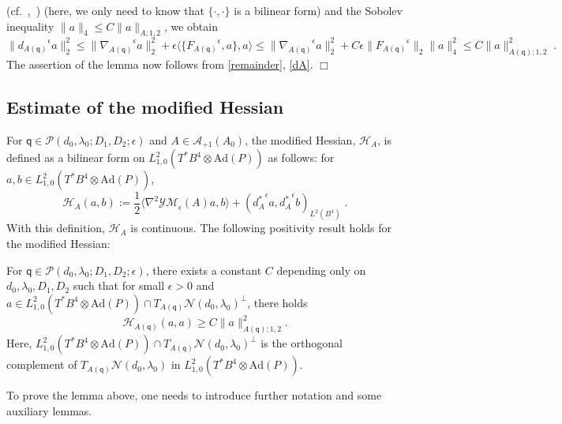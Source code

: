 \documentclass[11pt]{article}
\numberwithin{equation}{section} \setlength{\topmargin}{-35pt}
\newcommand{\PP}{\mathcal{P}}
\newcommand{\Ad}{\text{Ad}}
\newcommand{\YMe}{\mathcal{YM}_{\epsilon}}
\newcommand{\q}{\mathsf{q}}
\begin{document}
(cf.~\cite{DK},~\cite{FU}) (here, we only need to know that
$\{\cdot,\cdot\}$ is a bilinear form) and the Sobolev inequality
$\|a\|_4\le C\|a\|_{A;1,2}$, we obtain
\begin{equation}
\label{dA}
\|{d_{A(\q)}}^{\epsilon}a\|_2^2\le\|{\nabla_{A(\q)}}^{\epsilon}a\|_2^2+\epsilon\langle\{{F_{A(\q)}}^{\epsilon},a\},a\rangle
\le\|{\nabla_{A(\q)}}^{\epsilon}a\|^2_2+C\epsilon\|{F_{A(\q)}}^{\epsilon}\|_2\|a\|_4^2\le
C\|a\|_{A(\q);1,2}^2\;.
\end{equation}
The assertion of the lemma now follows from \eqref{remainder},
\eqref{dA}. \hfill$\Box$

\subsection{Estimate of the modified Hessian}
For $\q\in\PP(d_0,\lambda_0;D_1,D_2;\epsilon)$ and
$A\in\mathcal{A}_{+1}(A_0)$, the modified Hessian, $\mathcal{H}_A$,
is defined as a bilinear form on
$L^2_{1,0}(T^{\ast}B^4\otimes\Ad(P))$ as follows: for $a,b\in
L^2_{1,0}(T^{\ast}B^4\otimes\Ad(P))$,
\begin{equation}
\label{HA}
\mathcal{H}_A(a,b):=\frac{1}{2}\langle\nabla^2\YMe(A)a,b\rangle+({d_A^{\ast}}^{\epsilon}a,{d_A^{\ast}}^{\epsilon}b)_{L^2(B^4)}\;.
\end{equation}
With this definition, $\mathcal{H}_A$ is continuous. The following
positivity result holds for the modified Hessian:

\begin{lemma}
\label{L3.3} For $\q\in\PP(d_0,\lambda_0;D_1,D_2;\epsilon)$, there
exists a constant $C$ depending only on $d_0,\lambda_0, D_1, D_2$
such that for small $\epsilon>0$ and $a\in
L^2_{1,0}(T^{\ast}B^4\otimes\Ad(P))\cap
T_{A(\q)}\mathcal{N}(d_0,\lambda_0)^{\perp}$, there holds
$$\mathcal{H}_{A(\q)}(a,a)\ge C\|a\|_{A(\q);1,2}^2.$$
Here, $ L^2_{1,0}(T^{\ast}B^4\otimes\Ad(P))\cap
T_{A(\q)}\mathcal{N}(d_0,\lambda_0)^{\perp}$ is the orthogonal
complement of $T_{A(\q)}\mathcal{N}(d_0,\lambda_0)$ in
$L^2_{1,0}(T^{\ast}B^4\otimes\Ad(P))$.
\end{lemma}


\medskip
\noindent To prove the lemma above, one needs to introduce further
notation and some auxiliary lemmas.
\end{document}
